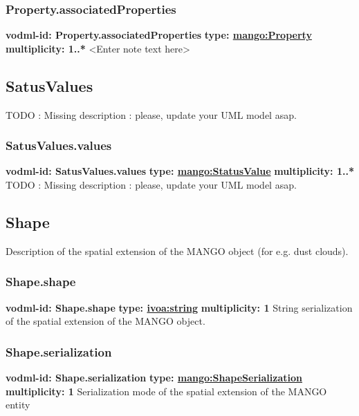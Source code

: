     \subsubsection{Property.associatedProperties}
      \textbf{vodml-id: Property.associatedProperties} \newline
      \textbf{type: \hyperref[sect:Property]{mango:Property}} \newline
      \textbf{multiplicity: 1..*} \newline 
      <Enter note text here>

  \subsection{SatusValues}
  \label{sect:SatusValues}
    TODO : Missing description : please, update your UML model asap.

    \subsubsection{SatusValues.values}
      \textbf{vodml-id: SatusValues.values} \newline
      \textbf{type: \hyperref[sect:StatusValue]{mango:StatusValue}} \newline
      \textbf{multiplicity: 1..*} \newline 
      TODO : Missing description : please, update your UML model asap.

  \subsection{Shape}
  \label{sect:Shape}
    Description of the spatial extension of the MANGO object (for e.g. dust clouds).

    \subsubsection{Shape.shape}
      \textbf{vodml-id: Shape.shape} \newline
      \textbf{type: \hyperref[sect:ivoa]{ivoa:string}} \newline
      \textbf{multiplicity: 1} \newline 
      String serialization of the spatial extension of the MANGO object.

    \subsubsection{Shape.serialization}
      \textbf{vodml-id: Shape.serialization} \newline
      \textbf{type: \hyperref[sect:ShapeSerialization]{mango:ShapeSerialization}} \newline
      \textbf{multiplicity: 1} \newline 
      Serialization mode of the spatial extension of the MANGO entity

